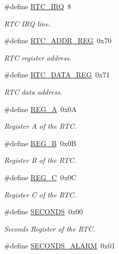 \begin{DoxyCompactItemize}
\item 
\#define \hyperlink{group__rtc_ga4e22feb6ffbc1cda32fadff5c740dc51}{R\+T\+C\+\_\+\+I\+RQ}~8
\begin{DoxyCompactList}\small\item\em R\+TC I\+RQ line. \end{DoxyCompactList}\item 
\#define \hyperlink{group__rtc_ga710b98232df2c563009e6f8a6cd18220}{R\+T\+C\+\_\+\+A\+D\+D\+R\+\_\+\+R\+EG}~0x70
\begin{DoxyCompactList}\small\item\em R\+TC register address. \end{DoxyCompactList}\item 
\#define \hyperlink{group__rtc_ga2f258a00c59c3f347c8d2d4a75471ce0}{R\+T\+C\+\_\+\+D\+A\+T\+A\+\_\+\+R\+EG}~0x71
\begin{DoxyCompactList}\small\item\em R\+TC data address. \end{DoxyCompactList}\item 
\#define \hyperlink{group__rtc_gaa0e40d1cb9fea79e800aa79b8ca291f7}{R\+E\+G\+\_\+A}~0x0A
\begin{DoxyCompactList}\small\item\em Register A of the R\+TC. \end{DoxyCompactList}\item 
\#define \hyperlink{group__rtc_ga28ed75c6727784e56c2bb8d828c876c9}{R\+E\+G\+\_\+B}~0x0B
\begin{DoxyCompactList}\small\item\em Register B of the R\+TC. \end{DoxyCompactList}\item 
\#define \hyperlink{group__rtc_ga088e580de0961d5f30eb3366f97b324c}{R\+E\+G\+\_\+C}~0x0C
\begin{DoxyCompactList}\small\item\em Register C of the R\+TC. \end{DoxyCompactList}\item 
\#define \hyperlink{group__rtc_ga48fcf4f2eeef6769d588168d4ac2ab0e}{S\+E\+C\+O\+N\+DS}~0x00
\begin{DoxyCompactList}\small\item\em Seconds Register of the R\+TC. \end{DoxyCompactList}\item 
\#define \hyperlink{group__rtc_ga59d336dbc295731898ece988d0ebbb8e}{S\+E\+C\+O\+N\+D\+S\+\_\+\+A\+L\+A\+RM}~0x01

\end{DoxyCompactItemize}
